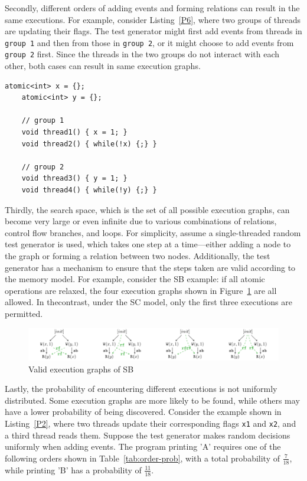 Secondly, different orders of adding events and forming relations can result in the same executions. For example, consider Listing~\ref{P6}, where two groups of threads are updating their flags. The test generator might first add events from threads in \texttt{group 1} and then from those in \texttt{group 2}, or it might choose to add events from \texttt{group 2} first. Since the threads in the two groups do not interact with each other, both cases can result in same execution graphs.


\begin{lstlisting}[caption={P6}, label={P6}]
    atomic<int> x = {}; 
    atomic<int> y = {}; 
    
    // group 1
    void thread1() { x = 1; }
    void thread2() { while(!x) {;} }

    // group 2
    void thread3() { y = 1; }
    void thread4() { while(!y) {;} }

\end{lstlisting}


Thirdly, the search space, which is the set of all possible execution graphs, can become very large or even infinite due to various combinations of relations, control flow branches, and loops. For simplicity, assume a single-threaded random test generator is used, which takes one step at a time—either adding a node to the graph or forming a relation between two nodes. Additionally, the test generator has a mechanism to ensure that the steps taken are valid according to the memory model. For example, consider the SB example: if all atomic operations are relaxed, the four execution graphs shown in Figure~\ref{SB4} are all allowed. In thecontrast, under the SC model, only the first three executions are permitted.


\begin{figure}[h!tbp]  
    \centering
    \includegraphics[scale=0.8]{figure/exec-graph/SB4.pdf}   
    \caption{Valid execution graphs of SB}  
    \label{SB4}  
\end{figure}



Lastly, the probability of encountering different executions is not uniformly distributed. Some execution graphs are more likely to be found, while others may have a lower probability of being discovered. Consider the example shown in Listing~\ref{P2}, where two threads update their corresponding flags \texttt{x1} and \texttt{x2}, and a third thread reads them. Suppose the test generator makes random decisions uniformly when adding events. The program printing 'A' requires one of the following orders shown in Table~\ref{tab:order-prob}, with a total probability of $\frac{7}{18}$, while printing 'B' has a probability of $\frac{11}{18}$.



